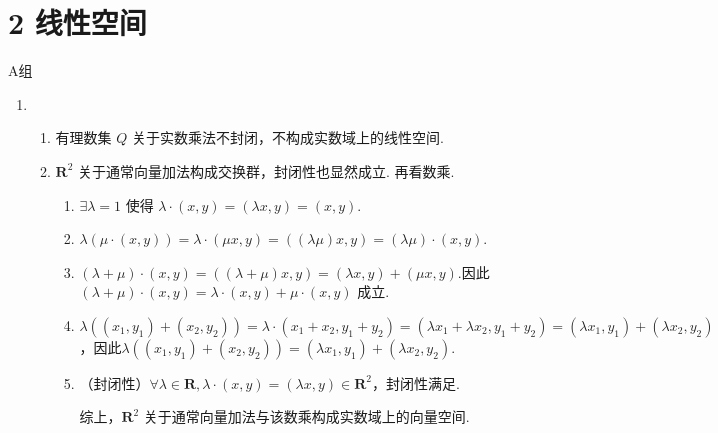 \section*{2 线性空间}

\vspace{2ex}

\centerline{\heiti A组}
\begin{enumerate}
    \item \begin{enumerate}
        \item 有理数集 $Q$ 关于实数乘法不封闭，不构成实数域上的线性空间.
        \item $\mathbf{R}^2$ 关于通常向量加法构成交换群，封闭性也显然成立. 再看数乘.
        \begin{enumerate}
            \item $\exists \lambda=1$ 使得 $\lambda\cdot(x,y)=(\lambda x,y)=(x,y)$.
            \item $\lambda(\mu\cdot(x,y))=\lambda\cdot(\mu x,y)=((\lambda\mu)x,y)=(\lambda\mu)\cdot(x,y)$.
            \item $(\lambda+\mu)\cdot(x,y)=((\lambda+\mu)x,y)=(\lambda x,y)+(\mu x,y)$.因此$(\lambda+\mu)\cdot(x,y)=\lambda\cdot(x,y)+\mu\cdot(x,y)$ 成立.
            \item $\lambda((x_1,y_1)+(x_2,y_2))=\lambda\cdot(x_1+x_2,y_1+y_2)=(\lambda x_1+\lambda x_2,y_1+y_2)=(\lambda x_1,y_1)+(\lambda x_2,y_2)$，因此$\lambda((x_1,y_1)+(x_2,y_2))=(\lambda x_1,y_1)+(\lambda x_2,y_2)$.
            \item （封闭性）$\forall \lambda \in \mathbf{R},\lambda\cdot(x,y)=(\lambda x,y)\in \mathbf{R}^2$，封闭性满足.

            综上，$\mathbf{R}^2$ 关于通常向量加法与该数乘构成实数域上的向量空间.
        \end{enumerate}


\end{enumerate}
\end{enumerate}
